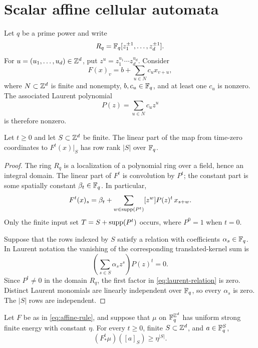 \section{Scalar affine cellular automata}
\label{sec:affine}

Let $q$ be a prime power and write
\[
  R_q=\mathbb{F}_q[z_1^{\pm1},\ldots,z_d^{\pm1}].
\]
For $u=(u_1,\ldots,u_d)\in\mathbb{Z}^d$, put
$z^u=z_1^{u_1}\cdots z_d^{u_d}$.  Consider
\begin{equation}\label{eq:affine-rule}
  F(x)_v=b+\sum_{u\in N}c_u x_{v+u},
\end{equation}
where $N\subset\mathbb{Z}^d$ is finite and nonempty, $b,c_u\in\mathbb{F}_q$, and at least one
$c_u$ is nonzero.  The associated Laurent polynomial
\[
  P(z)=\sum_{u\in N}c_u z^u
\]
is therefore nonzero.

\begin{lemma}\label{lem:affine-rank}
Let $t\geq0$ and let $S\subset\mathbb{Z}^d$ be finite.  The linear part of the map
from time-zero coordinates to $F^t(x)|_S$ has row rank $|S|$ over $\mathbb{F}_q$.
\end{lemma}

\begin{proof}
The ring $R_q$ is a localization of a polynomial ring over a field, hence an
integral domain.  The linear part of $F^t$ is convolution by $P^t$; the
constant part is some spatially constant $\beta_t\in\mathbb{F}_q$.  In particular,
\begin{equation}\label{eq:iterate-affine}
  F^t(x)_s=\beta_t+
    \sum_{w\in\operatorname{supp}(P^t)}[z^w]P(z)^t\,x_{s+w}.
\end{equation}
Only the finite input set
$T=S+\operatorname{supp}(P^t)$ occurs, where $P^0=1$ when $t=0$.

Suppose that the rows indexed by $S$ satisfy a relation with coefficients
$\alpha_s\in\mathbb{F}_q$.  In Laurent notation the vanishing of the corresponding
translated-kernel sum is
\begin{equation}\label{eq:laurent-relation}
   \left(\sum_{s\in S}\alpha_s z^s\right)P(z)^t=0.
\end{equation}
Since $P^t\neq0$ in the domain $R_q$, the first factor in
\eqref{eq:laurent-relation} is zero.  Distinct Laurent monomials are linearly
independent over $\mathbb{F}_q$, so every $\alpha_s$ is zero.  The $|S|$ rows are
independent.
\end{proof}

\begin{theorem}\label{thm:affine}
Let $F$ be as in \eqref{eq:affine-rule}, and suppose that $\mu$ on
$\mathbb{F}_q^{\mathbb{Z}^d}$ has uniform strong finite energy with constant $\eta$.  For
every $t\geq0$, finite $S\subset\mathbb{Z}^d$, and $a\in\mathbb{F}_q^S$,
\[
   (F^t_*\mu)([a]_S)\geq\eta^{|S|}.
\]
\end{theorem}

